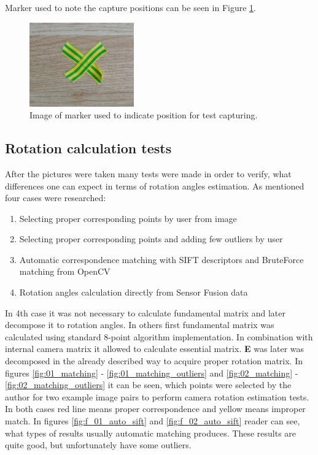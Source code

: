 Marker used to note the capture positions can be seen in Figure \ref{fig:marker_env}.
\begin{figure}[h!]
    \centering
    \includegraphics[width=0.4\textwidth]{marker_env}
    \caption{Image of marker used to indicate position for test capturing.}
    \label{fig:marker_env}
\end{figure}

\subsection{Rotation calculation tests}
After the pictures were taken many tests were made in order to verify, what differences one can expect in terms of rotation angles estimation. As mentioned four cases were researched:
\begin{enumerate} \label{enum:rotation_calcs_types}
\item Selecting proper corresponding points by user from image
\item Selecting proper corresponding points and adding few outliers by user
\item Automatic correspondence matching with SIFT descriptors and BruteForce matching from OpenCV
\item Rotation angles calculation directly from Sensor Fusion data
\end{enumerate}
In 4th case it was not necessary to calculate fundamental matrix and later decompose it to rotation angles. In others first fundamental matrix was calculated using standard 8-point algorithm implementation. In combination with internal camera matrix it allowed to calculate essential matrix. \textbf{E} was later was decomposed in the already described way to acquire proper rotation matrix. In figures \ref{fig:01_matching} - \ref{fig:01_matching_outliers} and \ref{fig:02_matching} - \ref{fig:02_matching_outliers} it can be seen, which points were selected by the author for two example image pairs to perform camera rotation estimation tests. In both cases red line means proper correspondence and yellow means improper match. In figures \ref{fig:f_01_auto_sift} and \ref{fig:f_02_auto_sift} reader can see, what types of results usually automatic matching produces. These results are quite good, but unfortunately have some outliers. 

